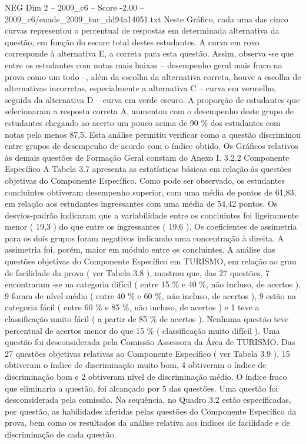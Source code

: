 \begin{textsample}{NEG Dim 2 – 2009\_c6 – Score -2.00 – 2009\_c6/enade\_2009\_tur\_dd94a14051.txt}
Neste Gráfico, cada uma das cinco curvas representou o percentual de respostas em determinada alternativa da questão, em função do escore total destes estudantes.
A curva em roxo corresponde à alternativa E, a correta para esta questão.
Assim, observa -se que entre os estudantes com notas mais baixas – desempenho geral mais fraco na prova como um todo –, além da escolha da alternativa correta, houve a escolha de alternativas incorretas, especialmente a alternativa C – curva em vermelho, seguida da alternativa D – curva em verde escuro.
A proporção de estudantes que selecionaram a resposta correta A, aumentou com o desempenho deste grupo de estudantes chegando ao acerto um pouco acima de 90 \% dos estudantes com notas pelo menos 87,5.
Esta análise permitiu verificar como a questão discriminou entre grupos de desempenho de acordo com o índice obtido.
Os Gráficos relativos às demais questões de Formação Geral constam do Anexo I. 3.2.2 Componente Específico A Tabela 3.7 apresenta as estatísticas básicas em relação às questões objetivas do Componente Específico.
Como pode ser observado, os estudantes concluintes obtiveram desempenho superior, com uma média de pontos de 61,83, em relação aos estudantes ingressantes com uma média de 54,42 pontos.
Os desvios-padrão indicaram que a variabilidade entre os concluintes foi ligeiramente menor ( 19,3 ) do que entre os ingressantes ( 19,6 ).
Os coeficientes de assimetria para os dois grupos foram negativos indicando uma concentração à direita.
A assimetria foi, porém, maior em módulo entre os concluintes.
A análise das questões objetivas do Componente Específico em TURISMO, em relação ao grau de facilidade da prova ( ver Tabela 3.8 ), mostrou que, das 27 questões, 7 encontraram -se na categoria difícil ( entre 15 \% e 40 \%, não incluso, de acertos ), 9 foram de nível médio ( entre 40 \% e 60 \%, não incluso, de acertos ), 9 estão na categoria fácil ( entre 60 \% e 85 \%, não incluso, de acertos ) e 1 teve a classificação muito fácil ( a partir de 85 \% de acertos ).
Nenhuma questão teve percentual de acertos menor do que 15 \% ( classificação muito difícil ).
Uma questão foi desconsiderada pela Comissão Assessora da Área de TURISMO.
Das 27 questões objetivas relativas ao Componente Específico ( ver Tabela 3.9 ), 15 obtiveram o índice de discriminação muito bom, 4 obtiveram o índice de discriminação bom e 2 obtiveram nível de discriminação médio.
O índice fraco que eliminaria a questão, foi alcançado por 5 das questões.
Uma questão foi desconsiderada pela comissão.
Na sequência, no Quadro 3.2 estão especificadas, por questão, as habilidades aferidas pelas questões do Componente Específico da prova, bem como os resultados da análise relativa aos índices de facilidade e de discriminação de cada questão.

\end{textsample}
